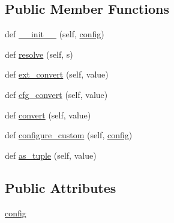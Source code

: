 \subsection*{Public Member Functions}
\begin{DoxyCompactItemize}
\item 
def \hyperlink{classpip_1_1__vendor_1_1distlib_1_1compat_1_1BaseConfigurator_a84644a9fa51fa50c1639f6f7e043f80b}{\+\_\+\+\_\+init\+\_\+\+\_\+} (self, \hyperlink{classpip_1_1__vendor_1_1distlib_1_1compat_1_1BaseConfigurator_a6472e0443febc69e1e2771c1cd5a9c02}{config})
\item 
def \hyperlink{classpip_1_1__vendor_1_1distlib_1_1compat_1_1BaseConfigurator_a7ac14d003fbddaa51c132a99ea9ea309}{resolve} (self, s)
\item 
def \hyperlink{classpip_1_1__vendor_1_1distlib_1_1compat_1_1BaseConfigurator_a99583d9b1713e0e7ed6f5e6024f6146c}{ext\+\_\+convert} (self, value)
\item 
def \hyperlink{classpip_1_1__vendor_1_1distlib_1_1compat_1_1BaseConfigurator_aa85372bd47adbd78337efd2e63716e5b}{cfg\+\_\+convert} (self, value)
\item 
def \hyperlink{classpip_1_1__vendor_1_1distlib_1_1compat_1_1BaseConfigurator_a9a6c1c008baaf93514e9e760b9d44fce}{convert} (self, value)
\item 
def \hyperlink{classpip_1_1__vendor_1_1distlib_1_1compat_1_1BaseConfigurator_a413001393d55f20868bf168573a1ff1d}{configure\+\_\+custom} (self, \hyperlink{classpip_1_1__vendor_1_1distlib_1_1compat_1_1BaseConfigurator_a6472e0443febc69e1e2771c1cd5a9c02}{config})
\item 
def \hyperlink{classpip_1_1__vendor_1_1distlib_1_1compat_1_1BaseConfigurator_ae736e3174fb056998a66ebdc08b28b65}{as\+\_\+tuple} (self, value)
\end{DoxyCompactItemize}
\subsection*{Public Attributes}
\begin{DoxyCompactItemize}
\item 
\hyperlink{classpip_1_1__vendor_1_1distlib_1_1compat_1_1BaseConfigurator_a6472e0443febc69e1e2771c1cd5a9c02}{config}
\end{DoxyCompactItemize}
